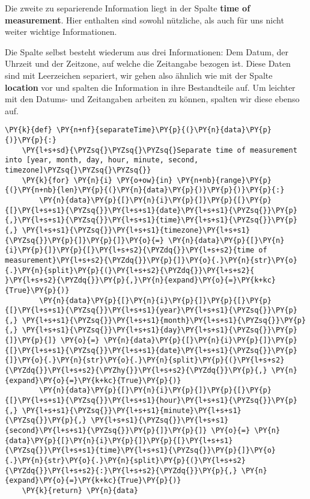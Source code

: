     Die zweite zu separierende Information liegt in der Spalte \textbf{time
of measurement}. Hier enthalten sind sowohl nützliche, als auch für uns
nicht weiter wichtige Informationen.

Die Spalte selbst besteht wiederum aus drei Informationen: Dem Datum,
der Uhrzeit und der Zeitzone, auf welche die Zeitangabe bezogen ist.
Diese Daten sind mit Leerzeichen separiert, wir gehen also ähnlich wie
mit der Spalte \textbf{location} vor und spalten die Information in ihre
Bestandteile auf. Um leichter mit den Datums- und Zeitangaben arbeiten
zu können, spalten wir diese ebenso auf.

    \begin{tcolorbox}[breakable, size=fbox, boxrule=1pt, pad at break*=1mm,colback=cellbackground, colframe=cellborder]
\begin{Verbatim}[commandchars=\\\{\}]
\PY{k}{def} \PY{n+nf}{separateTime}\PY{p}{(}\PY{n}{data}\PY{p}{)}\PY{p}{:}
    \PY{l+s+sd}{\PYZsq{}\PYZsq{}\PYZsq{}Separate time of measurement into [year, month, day, hour, minute, second, timezone]\PYZsq{}\PYZsq{}\PYZsq{}}
    \PY{k}{for} \PY{n}{i} \PY{o+ow}{in} \PY{n+nb}{range}\PY{p}{(}\PY{n+nb}{len}\PY{p}{(}\PY{n}{data}\PY{p}{)}\PY{p}{)}\PY{p}{:}
        \PY{n}{data}\PY{p}{[}\PY{n}{i}\PY{p}{]}\PY{p}{[}\PY{p}{[}\PY{l+s+s1}{\PYZsq{}}\PY{l+s+s1}{date}\PY{l+s+s1}{\PYZsq{}}\PY{p}{,}\PY{l+s+s1}{\PYZsq{}}\PY{l+s+s1}{time}\PY{l+s+s1}{\PYZsq{}}\PY{p}{,} \PY{l+s+s1}{\PYZsq{}}\PY{l+s+s1}{timezone}\PY{l+s+s1}{\PYZsq{}}\PY{p}{]}\PY{p}{]}\PY{o}{=} \PY{n}{data}\PY{p}{[}\PY{n}{i}\PY{p}{]}\PY{p}{[}\PY{l+s+s2}{\PYZdq{}}\PY{l+s+s2}{time of measurement}\PY{l+s+s2}{\PYZdq{}}\PY{p}{]}\PY{o}{.}\PY{n}{str}\PY{o}{.}\PY{n}{split}\PY{p}{(}\PY{l+s+s2}{\PYZdq{}}\PY{l+s+s2}{ }\PY{l+s+s2}{\PYZdq{}}\PY{p}{,}\PY{n}{expand}\PY{o}{=}\PY{k+kc}{True}\PY{p}{)}
        \PY{n}{data}\PY{p}{[}\PY{n}{i}\PY{p}{]}\PY{p}{[}\PY{p}{[}\PY{l+s+s1}{\PYZsq{}}\PY{l+s+s1}{year}\PY{l+s+s1}{\PYZsq{}}\PY{p}{,} \PY{l+s+s1}{\PYZsq{}}\PY{l+s+s1}{month}\PY{l+s+s1}{\PYZsq{}}\PY{p}{,} \PY{l+s+s1}{\PYZsq{}}\PY{l+s+s1}{day}\PY{l+s+s1}{\PYZsq{}}\PY{p}{]}\PY{p}{]} \PY{o}{=} \PY{n}{data}\PY{p}{[}\PY{n}{i}\PY{p}{]}\PY{p}{[}\PY{l+s+s1}{\PYZsq{}}\PY{l+s+s1}{date}\PY{l+s+s1}{\PYZsq{}}\PY{p}{]}\PY{o}{.}\PY{n}{str}\PY{o}{.}\PY{n}{split}\PY{p}{(}\PY{l+s+s2}{\PYZdq{}}\PY{l+s+s2}{\PYZhy{}}\PY{l+s+s2}{\PYZdq{}}\PY{p}{,} \PY{n}{expand}\PY{o}{=}\PY{k+kc}{True}\PY{p}{)}
        \PY{n}{data}\PY{p}{[}\PY{n}{i}\PY{p}{]}\PY{p}{[}\PY{p}{[}\PY{l+s+s1}{\PYZsq{}}\PY{l+s+s1}{hour}\PY{l+s+s1}{\PYZsq{}}\PY{p}{,} \PY{l+s+s1}{\PYZsq{}}\PY{l+s+s1}{minute}\PY{l+s+s1}{\PYZsq{}}\PY{p}{,} \PY{l+s+s1}{\PYZsq{}}\PY{l+s+s1}{second}\PY{l+s+s1}{\PYZsq{}}\PY{p}{]}\PY{p}{]} \PY{o}{=} \PY{n}{data}\PY{p}{[}\PY{n}{i}\PY{p}{]}\PY{p}{[}\PY{l+s+s1}{\PYZsq{}}\PY{l+s+s1}{time}\PY{l+s+s1}{\PYZsq{}}\PY{p}{]}\PY{o}{.}\PY{n}{str}\PY{o}{.}\PY{n}{split}\PY{p}{(}\PY{l+s+s2}{\PYZdq{}}\PY{l+s+s2}{:}\PY{l+s+s2}{\PYZdq{}}\PY{p}{,} \PY{n}{expand}\PY{o}{=}\PY{k+kc}{True}\PY{p}{)}
    \PY{k}{return} \PY{n}{data}
\end{Verbatim}
\end{tcolorbox}

